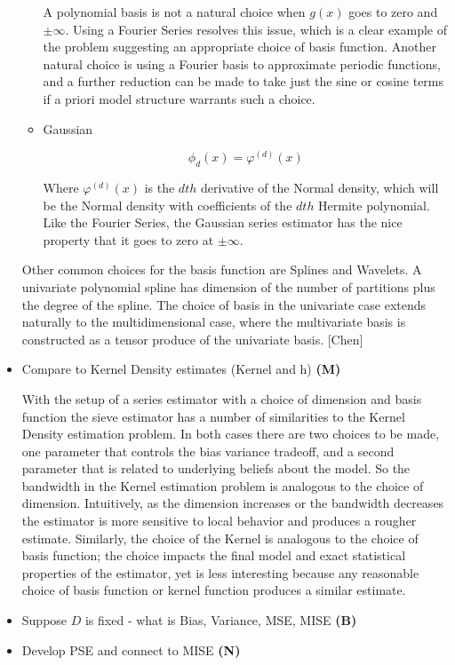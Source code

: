 \documentclass[12pt]{article}  %
\begin{document}
\begin{itemize}
\begin{itemize}
A polynomial basis is not a natural choice when $g(x)$ goes to zero and $\pm \infty$. Using a Fourier Series resolves this issue, which is a clear example of the problem suggesting an appropriate choice of basis function.  Another natural choice is using a Fourier basis to approximate periodic functions, and a further reduction can be made to take just the sine or cosine terms if a priori model structure warrants such a choice.

\item Gaussian 

$$  \phi_d(x) = \varphi^{(d)}(x)$$

Where $\varphi^{(d)}(x)$ is the $dth$ derivative of the Normal density, which will be the Normal density with coefficients  of the $dth$ Hermite polynomial. Like the Fourier Series, the Gaussian series estimator has the nice property that it goes to zero at $\pm \infty$.

\end{itemize}

Other common choices for the basis function are Splines and Wavelets. A univariate polynomial spline has dimension of the number of partitions plus the degree of the spline.  The choice of basis in the univariate case extends naturally to the multidimensional case, where the multivariate basis is constructed as a tensor produce of the univariate basis. [Chen]



\item Compare to Kernel Density estimates (Kernel and h) \textbf{(M)}

With the setup of a series estimator with a choice of dimension and basis function the sieve estimator has a number of similarities to the Kernel Density estimation problem.  In both cases there are two choices to be made, one parameter that controls the bias variance tradeoff, and a second parameter that is related to underlying beliefs about the model.  So the bandwidth in the Kernel estimation problem is analogous to the choice of dimension. Intuitively, as the dimension increases or the bandwidth decreases the estimator is more sensitive to local behavior and produces a rougher estimate. Similarly, the choice of the Kernel is analogous to the choice of basis function; the choice impacts the final model and exact statistical properties of the estimator, yet is less interesting because any reasonable choice of basis function or kernel function produces a similar estimate. 

\item Suppose $D$ is fixed - what is Bias, Variance, MSE, MISE \textbf{(B)}
\item Develop PSE and connect to MISE \textbf{(N)}


\end{itemize}
\end{document}
